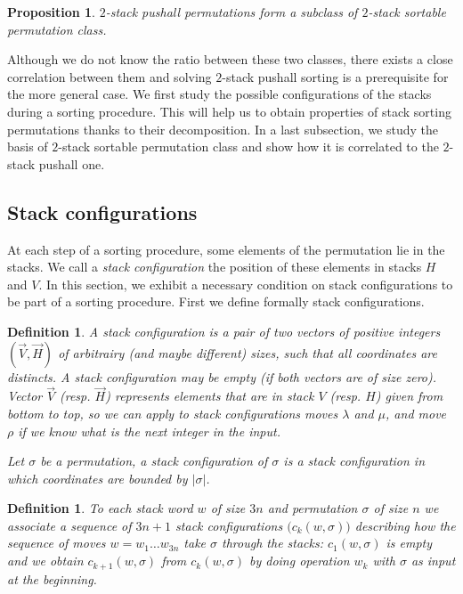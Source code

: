 \documentclass[11pt]{article}
\newtheorem{prop}[thm]{Proposition}
\newtheorem{defn}[thm]{Definition}
\begin{document}
\begin{prop}
$2$-stack pushall permutations form a subclass of $2$-stack sortable permutation class.
\end{prop}


Although we do not know the ratio between these two classes, there exists a close correlation between them and solving $2$-stack pushall sorting is a prerequisite for the more general case. 
We first study the possible configurations of the stacks during a sorting procedure. 
This will help us to obtain properties of stack sorting permutations thanks to their decomposition. 
In a last subsection, we study the basis of $2$-stack sortable permutation class and show how it is correlated to the $2$-stack pushall one.

\subsection{Stack configurations}

At each step of a sorting procedure, some elements of the permutation lie in the stacks. 
We call a {\em stack configuration} the position of these elements in stacks $H$ and $V$. 
In this section, we exhibit a necessary condition on stack configurations to be part of a sorting procedure.
First we define formally stack configurations.

\begin{defn}
A {\em stack configuration} is a pair of two vectors of positive integers $(\overrightarrow{V},\overrightarrow{H})$ of arbitrairy (and maybe different) sizes, such that all coordinates are distincts.
A stack configuration may be empty (if both vectors are of size zero).
Vector $\overrightarrow{V}$ (resp. $\overrightarrow{H}$) represents elements that are in stack $V$ (resp. $H$) given from bottom to top, so we can apply to stack configurations moves $\lambda$ and $\mu$, and move $\rho$ if we know what is the next integer in the input.

Let $\sigma$ be a permutation, a stack configuration of $\sigma$ is a stack configuration in which coordinates are bounded by $|\sigma|$.
\end{defn}


\begin{defn}
To each stack word $w$ of size $3n$ and permutation $\sigma$ of size $n$ we associate a sequence of $3n+1$ stack configurations $\big(c_k(w,\sigma)\big)$ describing how the sequence of moves $w= w_1 \dots w_{3n}$ take $\sigma$ through the stacks: $c_1(w,\sigma)$ is empty and we obtain $c_{k+1}(w,\sigma)$ from $c_k(w,\sigma)$ by doing operation $w_k$ with $\sigma$ as input at the beginning.
\end{defn}
\end{document}
